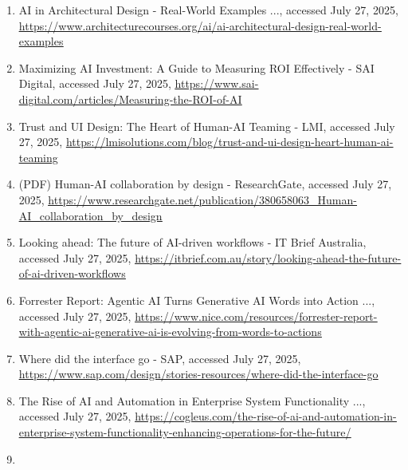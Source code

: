 \documentclass[
  12pt,
  a4paper,
  bibliography=totoc,
  numbers=noenddot
]{scrartcl}
\begin{document}
\begin{enumerate}
\item
  AI in Architectural Design - Real-World Examples ..., accessed July
  27, 2025,
  \href{https://www.architecturecourses.org/ai/ai-architectural-design-real-world-examples}{\ul{https://www.architecturecourses.org/ai/ai-architectural-design-real-world-examples}}
\item
  Maximizing AI Investment: A Guide to Measuring ROI Effectively - SAI
  Digital, accessed July 27, 2025,
  \href{https://www.sai-digital.com/articles/Measuring-the-ROI-of-AI}{\ul{https://www.sai-digital.com/articles/Measuring-the-ROI-of-AI}}
\item
  Trust and UI Design: The Heart of Human-AI Teaming - LMI, accessed
  July 27, 2025,
  \href{https://lmisolutions.com/blog/trust-and-ui-design-heart-human-ai-teaming}{\ul{https://lmisolutions.com/blog/trust-and-ui-design-heart-human-ai-teaming}}
\item
  (PDF) Human-AI collaboration by design - ResearchGate, accessed July
  27, 2025,
  \href{https://www.researchgate.net/publication/380658063_Human-AI_collaboration_by_design}{\ul{https://www.researchgate.net/publication/380658063\_Human-AI\_collaboration\_by\_design}}
\item
  Looking ahead: The future of AI-driven workflows - IT Brief Australia,
  accessed July 27, 2025,
  \href{https://itbrief.com.au/story/looking-ahead-the-future-of-ai-driven-workflows}{\ul{https://itbrief.com.au/story/looking-ahead-the-future-of-ai-driven-workflows}}
\item
  Forrester Report: Agentic AI Turns Generative AI Words into Action
  ..., accessed July 27, 2025,
  \href{https://www.nice.com/resources/forrester-report-with-agentic-ai-generative-ai-is-evolving-from-words-to-actions}{\ul{https://www.nice.com/resources/forrester-report-with-agentic-ai-generative-ai-is-evolving-from-words-to-actions}}
\item
  Where did the interface go - SAP, accessed July 27, 2025,
  \href{https://www.sap.com/design/stories-resources/where-did-the-interface-go}{\ul{https://www.sap.com/design/stories-resources/where-did-the-interface-go}}
\item
  The Rise of AI and Automation in Enterprise System Functionality ...,
  accessed July 27, 2025,
  \href{https://cogleus.com/the-rise-of-ai-and-automation-in-enterprise-system-functionality-enhancing-operations-for-the-future/}{\ul{https://cogleus.com/the-rise-of-ai-and-automation-in-enterprise-system-functionality-enhancing-operations-for-the-future/}}
\item

\end{enumerate}
\end{document}
